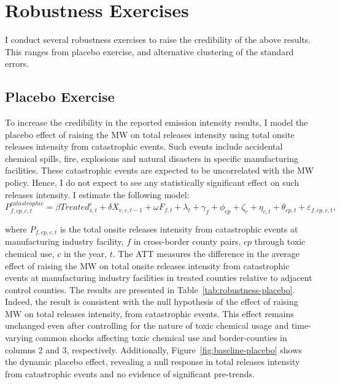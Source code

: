 \documentclass{C:/Users/david/OneDrive/Documents/ULMS/PhD/Thesis/chapter3/src/climate_change/latex/Economic_Journal/OUP-EJ}
\begin{document}
    \section{Robustness Exercises}\label{sec:robustness-exercises}
    I conduct several robustness exercises to raise the credibility of the above results. This ranges from placebo exercise, and alternative clustering of the standard errors.

    \subsection{Placebo Exercise}\label{subsec:placebo-exercise}
    To increase the credibility in the reported emission intensity results, I model the placebo effect of raising the MW on total releases intensity using total onsite releases intensity from catastrophic events. Such events include accidental chemical spills, fire, explosions and natural disasters in specific manufacturing facilities. These catastrophic events are expected to be uncorrelated with the MW policy. Hence, I do not expect to see any statistically significant effect on such releases intensity. I estimate the following model:
    \begin{equation}
        P_{f,cp,c,t}^{catastrophic} = \beta Treated_{s,t}^e + \delta X_{v,c,t-1} + \omega F_{f,t} + \lambda_{t} + \gamma_{f} + \phi_{cp} + \zeta_{c} + \eta_{c,t} + \theta_{cp,t} + \varepsilon_{f,cp,c,t},\label{eq:robustness-placebo}
    \end{equation}
    

    where $P_{f,cp,c,t}$ is the total onsite releases intensity from catastrophic events at manufacturing industry facility, $f$ in cross-border county pairs, $cp$ through toxic chemical use, $c$ in the year, $t$. The ATT measures the difference in the average effect of raising the MW on total onsite releases intensity from catastrophic events at manufacturing industry facilities in treated counties relative to adjacent control counties. The results are presented in Table~\ref{tab:robustness-placebo}. Indeed, the result is consistent with the null hypothesis of the effect of raising MW on total releases intensity, from catastrophic events. This effect remains unchanged even after controlling for the nature of toxic chemical usage and time-varying common shocks affecting toxic chemical use and border-counties in columns $2$ and $3$, respectively. Additionally, Figure~\ref{fig:baseline-placebo} shows the dynamic placebo effect, revealing a null response in total releases intensity from catastrophic events and no evidence of significant pre-trends.
    
\end{document}
